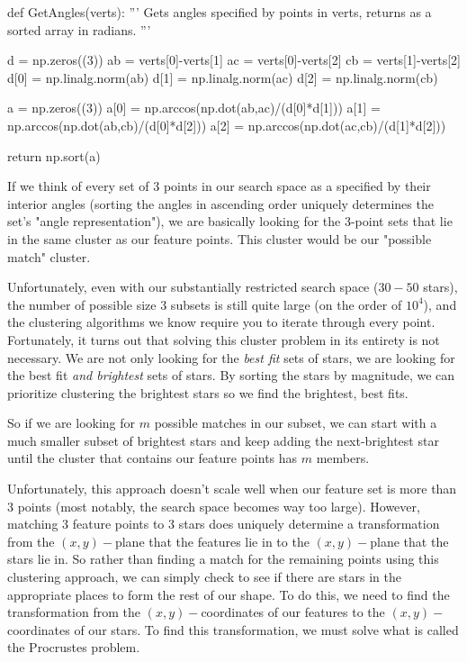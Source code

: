 \documentclass[paper=a4, fontsize=11pt]{scrartcl} %
\begin{document}
\begin{python}
def GetAngles(verts):
    '''
    Gets angles specified by points in verts,
    returns as a sorted array in radians.
    '''
    
    d = np.zeros((3))
    ab = verts[0]-verts[1]
    ac = verts[0]-verts[2]
    cb = verts[1]-verts[2]
    d[0] = np.linalg.norm(ab)
    d[1] = np.linalg.norm(ac)
    d[2] = np.linalg.norm(cb)
    
    a = np.zeros((3))
    a[0] = np.arccos(np.dot(ab,ac)/(d[0]*d[1]))
    a[1] = np.arccos(np.dot(ab,cb)/(d[0]*d[2]))
    a[2] = np.arccos(np.dot(ac,cb)/(d[1]*d[2]))
    
    return np.sort(a)
\end{python}

If we think of every set of 3 points in our search space as a specified by their interior angles (sorting the angles in ascending order uniquely determines the set's "angle representation"), we are basically looking for the 3-point sets that lie in the same cluster as our feature points. This cluster would be our "possible match" cluster.


Unfortunately, even with our substantially restricted search space ($30-50$ stars), the number of possible size 3 subsets is still quite large (on the order of $10^4$), and the clustering algorithms we know require you to iterate through every point. Fortunately, it turns out that solving this cluster problem in its entirety is not necessary. We are not only looking for the \textit{best fit} sets of stars, we are looking for the best fit \textit{and brightest} sets of stars. By sorting the stars by magnitude, we can prioritize clustering the brightest stars so we find the brightest, best fits.

So if we are looking for $m$ possible matches in our subset, we can start with a much smaller subset of brightest stars and keep adding the next-brightest star until the cluster that contains our feature points has $m$ members.

Unfortunately, this approach doesn't scale well when our feature set is more than 3 points (most notably, the search space becomes way too large). However, matching 3 feature points to 3 stars does uniquely determine a transformation from the $(x,y)-$plane that the features lie in to the $(x,y)-$plane that the stars lie in. So rather than finding a match for the remaining points using this clustering approach, we can simply check to see if there are stars in the appropriate places to form the rest of our shape. To do this, we need to find the transformation from the $(x,y)-$coordinates of our features to the $(x,y)-$coordinates of our stars. To find this transformation, we must solve what is called the Procrustes problem.
\end{document}
